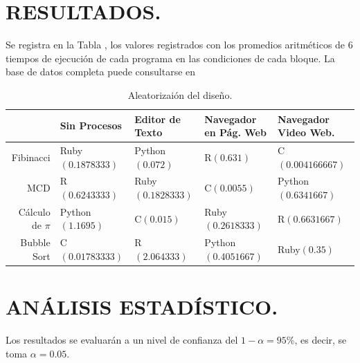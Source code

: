 \documentclass[11pt,a4paper]{article}
\begin{document}

\newpage

\section{RESULTADOS.} %
\label{sec:resultados}
Se registra en la Tabla , los valores registrados con los promedios aritméticos de \(6\) tiempos de ejecución de cada programa en las condiciones de cada bloque.
La base de datos completa puede consultarse en 
\begin{table}[hbt!]
	\centering
	\footnotesize 
	\begin{tabular}{|r|*{4}{l|}}
		\hline 
		& Sin Procesos &	Editor de Texto &	Navegador en Pág. Web & Navegador Video Web. \\ \hline
		Fibinacci & Ruby\((0.1878333)\) &  Python\((0.072)\) &  R\((0.631)\) &  C\((0.004166667)\)\\
		MCD & R\((0.6243333)\) &  Ruby\((0.1828333)\) &  C\((0.0055)\) &  Python\((0.6341667)\)\\
		Cálculo de \(\pi\) & Python\((1.1695)\) &  C\((0.015)\) &  Ruby\((0.2618333)\) &  R\((0.6631667)\)\\
		Bubble Sort & C\((0.01783333)\) &  R\((2.064333)\) &  Python\((0.4051667)\) &  Ruby\((0.35)\) \\ \hline
	\end{tabular}
	\caption{Aleatorizaión del diseño.} 
	\label{tab:resultados}
\end{table}

\section{ANÁLISIS ESTADÍSTICO.} %

Los resultados se evaluarán a un nivel de confianza del \(1- \alpha = 95\)\textsc{\%}, es decir, se toma \(\alpha = 0.05\).
\end{document}
